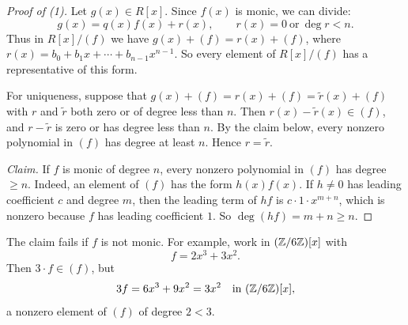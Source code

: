 \documentclass[reqno,11pt]{amsart}
\begin{document}
\begin{proof}[Proof of \textup{(1)}]
Let $g(x)\in R[x]$. Since $f(x)$ is monic, we can divide:
\[
  g(x)=q(x)f(x)+r(x),\qquad r(x)=0\ \text{or}\ \deg r<n.
\]
Thus in $R[x]/(f)$ we have $g(x)+(f)=r(x)+(f)$, where
$r(x)=b_0+b_1x+\cdots+b_{n-1}x^{n-1}$. So every element of
$R[x]/(f)$ has a representative of this form.

For uniqueness, suppose that $g(x)+(f)=r(x)+(f)=\tilde r(x)+(f)$
with $r$ and $\tilde r$ both zero or of degree less than $n$. Then
$r(x)-\tilde r(x)\in(f)$, and $r-\tilde r$ is zero or has degree
less than $n$. By the claim below, every nonzero polynomial in $(f)$
has degree at least $n$. Hence $r=\tilde r$.

\emph{Claim.} If $f$ is monic of degree $n$, every nonzero polynomial
in $(f)$ has degree $\geq n$. Indeed, an element of $(f)$ has the form
$h(x)f(x)$. If $h\neq0$ has leading coefficient $c$ and degree $m$,
then the leading term of $hf$ is $c\cdot1\cdot x^{m+n}$, which is
nonzero because $f$ has leading coefficient $1$. So
$\deg(hf)=m+n\geq n$.
\end{proof}

\begin{warningbox}
The claim fails if $f$ is not monic. For example, work in
$(\mathbb{Z}/6\mathbb{Z})[x]$ with
\[
  f=2x^3+3x^2.
\]
Then $3\cdot f\in(f)$, but
\[
  3f=6x^3+9x^2=3x^2\quad\text{in }(\mathbb{Z}/6\mathbb{Z})[x],
\]
a nonzero element of $(f)$ of degree $2<3$.
\end{warningbox}

\fi
\end{document}
